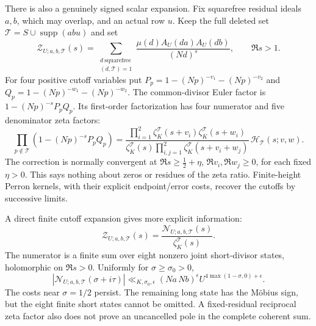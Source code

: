 \documentclass[11pt]{article}
\theoremstyle{definition}\newtheorem{definition}[theorem]{Definition}
\theoremstyle{remark}\newtheorem{remark}[theorem]{Remark}
\begin{document}
There is also a genuinely signed scalar expansion. Fix squarefree residual
ideals $a,b$, which may overlap, and an actual row $u$.
Keep the full deleted set $\mathcal T=S\cup\operatorname{supp}(abu)$ and set
\[
 \mathcal Z_{U;a,b,\mathcal T}(s)=
 \sum_{\substack{d\ \mathrm{squarefree}\\(d,\mathcal T)=1}}
 \frac{\mu(d)A_U(da)A_U(db)}{(Nd)^s},\qquad\Re s>1.
\]
For four positive cutoff variables put
$P_p=1-(Np)^{-v_1}-(Np)^{-v_2}$ and
$Q_p=1-(Np)^{-w_1}-(Np)^{-w_2}$.
The common-divisor Euler factor is $1-(Np)^{-s}P_pQ_p$.
Its first-order factorization has four numerator and five denominator
zeta factors:
\begin{equation}\label{sd:nine}
 \prod_{p\notin\mathcal T}(1-(Np)^{-s}P_pQ_p)
 =\frac{\prod_{i=1}^2\zeta_K^{\mathcal T}(s+v_i)
                         \zeta_K^{\mathcal T}(s+w_i)}
 {\zeta_K^{\mathcal T}(s)
       \prod_{i,j=1}^2\zeta_K^{\mathcal T}(s+v_i+w_j)}\,
       \mathcal H_{\mathcal T}(s;v,w).
\end{equation}
The correction is normally convergent at
$\Re s\ge\tfrac12+\eta$, $\Re v_i,\Re w_j\ge0$, for each fixed
$\eta>0$. This says nothing about zeros or residues of the zeta ratio.
Finite-height Perron kernels, with their explicit endpoint/error costs,
recover the cutoffs by successive limits.

A direct finite cutoff expansion gives more explicit information:
\begin{equation}\label{sd:finite-numerator}
 \mathcal Z_{U;a,b,\mathcal T}(s)
       =\frac{\mathcal N_{U;a,b,\mathcal T}(s)}
                    {\zeta_K^{\mathcal T}(s)}.
\end{equation}
The numerator is a finite sum over eight nonzero joint short-divisor
states, holomorphic on $\Re s>0$. Uniformly for $\sigma\ge\sigma_0>0$,
\[
 |\mathcal N_{U;a,b,\mathcal T}(\sigma+i\tau)|
 \ll_{K,\sigma_0,\epsilon}(Na\,Nb)^\epsilon
             U^{4\max(1-\sigma,0)+\epsilon}.
\]
The costs near $\sigma=1/2$ persist. The remaining long state has the
M\"obius sign, but the eight finite short states cannot be omitted.
A fixed-residual reciprocal zeta factor also does not prove an
uncancelled pole in the complete coherent sum.
\end{document}
